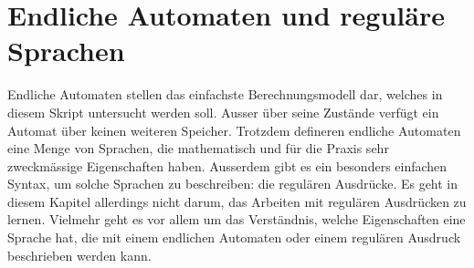 %
%
\chapter{Endliche Automaten und reguläre Sprachen\label{chapter-regular}}
Endliche Automaten stellen das einfachste Berechnungsmodell
dar, welches in diesem Skript untersucht werden soll.
Ausser über seine Zustände verfügt ein Automat über keinen weiteren
Speicher.
Trotzdem defineren endliche Automaten eine Menge von Sprachen, die 
mathematisch und für die Praxis sehr zweckmässige Eigenschaften
haben.
Ausserdem gibt es ein besonders einfachen Syntax, um
solche Sprachen zu beschreiben: die regulären Ausdrücke.
Es geht in diesem Kapitel allerdings nicht darum, das Arbeiten
mit regulären Ausdrücken zu lernen.
Vielmehr geht es vor allem um das Verständnis, welche Eigenschaften
eine Sprache hat, die mit einem endlichen Automaten oder einem
regulären Ausdruck beschrieben werden kann.






